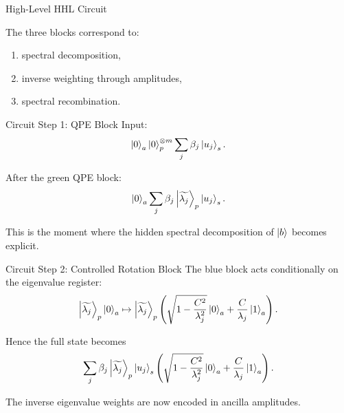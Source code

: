 \documentclass{beamer}
\begin{document}
\begin{frame}{High-Level HHL Circuit}

\medskip

The three blocks correspond to:
\begin{enumerate}
    \item spectral decomposition,
    \item inverse weighting through amplitudes,
    \item spectral recombination.
\end{enumerate}
\end{frame}

\begin{frame}{Circuit Step 1: QPE Block}
Input:
\[
\ket{0}_a \ket{0}^{\otimes m}_p \sum_j \beta_j \ket{u_j}_s.
\]

After the green QPE block:
\[
\ket{0}_a \sum_j \beta_j \ket{\widetilde{\lambda_j}}_p \ket{u_j}_s.
\]

This is the moment where the hidden spectral decomposition of \(\ket{b}\) becomes explicit.
\end{frame}

\begin{frame}{Circuit Step 2: Controlled Rotation Block}
The blue block acts conditionally on the eigenvalue register:
\[
\ket{\widetilde{\lambda_j}}_p \ket{0}_a
\mapsto
\ket{\widetilde{\lambda_j}}_p
\left(
\sqrt{1-\frac{C^2}{\lambda_j^2}}\ket{0}_a
+
\frac{C}{\lambda_j}\ket{1}_a
\right).
\]

Hence the full state becomes
\[
\sum_j \beta_j \ket{\widetilde{\lambda_j}}_p \ket{u_j}_s
\left(
\sqrt{1-\frac{C^2}{\lambda_j^2}}\ket{0}_a
+
\frac{C}{\lambda_j}\ket{1}_a
\right).
\]

The inverse eigenvalue weights are now encoded in ancilla amplitudes.
\end{frame}
\end{document}
